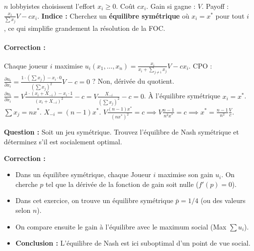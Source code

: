 \begin{exemple}
$n$ lobbyistes choisissent l'effort $x_i \ge 0$. Coût $cx_i$. Gain si gagne : $V$. Payoff : $\frac{x_i}{\sum x_j}V - cx_i$.
\textbf{Indice :} Cherchez un \textbf{équilibre symétrique} où $x_i = x^*$ pour tout $i$, ce qui simplifie grandement la résolution de la FOC.

\paragraph{Correction :}
Chaque joueur $i$ maximise $u_i(x_1, \dots, x_n) = \frac{x_i}{x_i + \sum_{j \ne i} x_j} V - c x_i$.
CPO : $\frac{\partial u_i}{\partial x_i} = \frac{1 \cdot (\sum x_j) - x_i \cdot 0}{(\sum x_j)^2} V - c = 0$ ? Non, dérivée du quotient.
$\frac{\partial u_i}{\partial x_i} = V \frac{1 \cdot (x_i + X_{-i}) - x_i \cdot 1}{(x_i + X_{-i})^2} - c = V \frac{X_{-i}}{(\sum x_j)^2} - c = 0$.
À l'équilibre symétrique $x_i = x^*$. $\sum x_j = n x^*$. $X_{-i} = (n-1)x^*$.
$V \frac{(n-1)x^*}{(n x^*)^2} = c \implies V \frac{n-1}{n^2 x^*} = c \implies x^* = \frac{n-1}{n^2} \frac{V}{c}$.
\end{exemple}

\begin{exemple}
\textbf{Question :}
Soit un jeu symétrique. Trouvez l'équilibre de Nash symétrique et déterminez s'il est socialement optimal.

\textbf{Correction :}
\begin{itemize}
    \item Dans un équilibre symétrique, chaque Joueur $i$ maximise son gain $u_i$. On cherche $p$ tel que la dérivée de la fonction de gain soit nulle ($f'(p) = 0$).
    \item Dans cet exercice, on trouve un équilibre symétrique $\bar{p} = 1/4$ (ou des valeurs selon $n$).
    \item On compare ensuite le gain à l'équilibre avec le maximum social (Max $\sum u_i$).
    \item \textbf{Conclusion :} L'équilibre de Nash est ici suboptimal d'un point de vue social.
\end{itemize}


\end{exemple}

